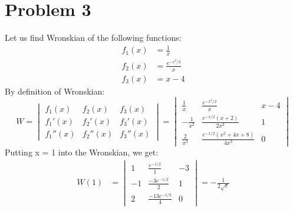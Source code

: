 \documentclass[12pt]{article}
\begin{document}
\section{Problem 3}
Let us find Wronskian of the following functions:
\begin{equation}
    \begin{split}
        f_1(x) &= \frac{1}{x} \\
        f_2(x) &= \frac{e^{-x^2/2}}{x} \\
        f_3(x) &= x-4
    \end{split}
\end{equation}
By definition of Wronskian:
\begin{equation}
    W = \begin{vmatrix}
        f_1(x) & f_2(x) & f_3(x) \\
        f_1'(x) & f_2'(x) & f_3'(x) \\
        f_1''(x) & f_2''(x) & f_3''(x)
    \end{vmatrix} = 
    \begin{vmatrix}
        \frac{1}{x} & \frac{e^{-x^2/2}}{x} & x-4 \\
        -\frac{1}{x^2} & \frac{e^{-x/2}(x+2)}{2x^2} & 1 \\
        \frac{2}{x^3} & \frac{e^{-x/2}(x^2+4x+8)}{4x^3}  & 0
    \end{vmatrix}
\end{equation}
Putting x = 1 into the Wronskian, we get:
\begin{equation}
    \begin{split}
        W(1) &= 
        \begin{vmatrix}
            1 & \frac{e^{-1/2}}{1} & -3 \\
            -1 & \frac{-3e^{-1/2}}{2} & 1 \\
            2 & \frac{-13e^{-1/2}}{4}  & 0
        \end{vmatrix} = -\frac{1}{2\sqrt{e}}        
    \end{split}
\end{equation}
\end{document}
